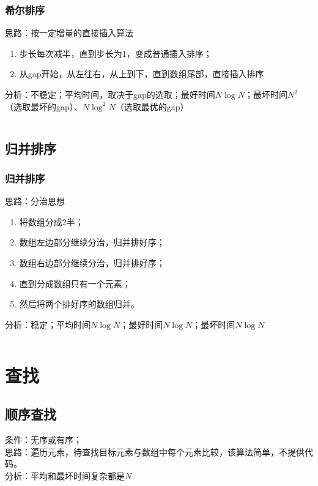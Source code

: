 \documentclass{article}
\begin{document}
    \subsubsection{希尔排序}
    思路：按一定增量的直接插入算法
    \begin{enumerate}
      \item 步长每次减半，直到步长为1，变成普通插入排序；
      \item 从gap开始，从左往右，从上到下，直到数组尾部，直接插入排序
    \end{enumerate}
    分析：不稳定；平均时间，取决于gap的选取；最好时间$N \log N$；最坏时间$N^2$（选取最坏的gap）、$N {\log}^2 N$（选取最优的gap）

    \inputminted{java}{src/chapter02/ShellSort.java}

  \subsection{归并排序}
    \subsubsection{归并排序}
    思路：分治思想
    \begin{enumerate}
      \item 将数组分成2半；
      \item 数组左边部分继续分治，归并排好序；
      \item 数组右边部分继续分治，归并排好序；
      \item 直到分成数组只有一个元素；
      \item 然后将两个排好序的数组归并。
    \end{enumerate}
    分析：稳定；平均时间$N \log N$；最好时间$N \log N$；最坏时间$N \log N$

    \inputminted{java}{src/chapter02/MergeSort.java}

  \section{查找}
    \subsection{顺序查找}
      条件：无序或有序；
      \\[10pt] 思路：遍历元素，待查找目标元素与数组中每个元素比较，该算法简单，不提供代码。
      \\[10pt] 分析：平均和最坏时间复杂都是$N$
\end{document}

